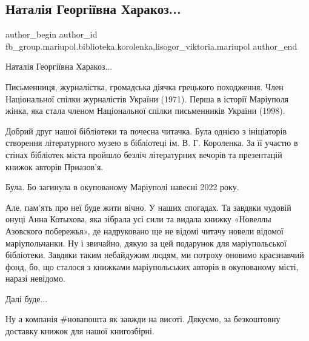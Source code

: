  
 
 
 
 

\subsection{Наталія Георгіївна Харакоз...}
\label{sec:18_01_2023.fb.fb_group.mariupol.biblioteka.korolenka.1.natal_ya_georg_vna_}
 
\ifcmt
 author_begin
   author_id fb_group.mariupol.biblioteka.korolenka,lisogor_viktoria.mariupol
 author_end
\fi

Наталія Георгіївна Харакоз...

Письменниця, журналістка, громадська діячка грецького походження. Член
Національної спілки журналістів України (1971). Перша в історії Маріуполя
жінка, яка стала членом Національної спілки письменників України (1998).

Добрий друг нашої бібліотеки та почесна читачка. Була однією з ініціаторів
створення літературного музею в бібліотеці ім. В. Г. Короленка. За її участю в
стінах бібліотек міста пройшло безліч літературних вечорів та презентацій
книжок авторів Приазов'я.

Була. Бо загинула в окупованому Маріуполі навесні 2022 року.

Але, пам'ять про неї буде жити вічно. У наших спогадах. Та завдяки чудовій
онуці Анна Котыхова, яка зібрала усі сили та видала книжку «Новеллы Азовского
побережья», де надруковано ще не відомі читачу новели відомої маріупольчанки.
Ну і звичайно, дякую за цей подарунок для маріупольської бібліотеки. Завдяки
таким небайдужим людям, ми потроху оновимо краєзнавчий фонд, бо, що сталося з
книжками маріупольських авторів в окупованому місті, наразі невідомо.

Далі буде...

Ну а компанія \#новапошта як завжди на висоті. Дякуємо, за безкоштовну доставку
книжок для нашої книгозбірні.

